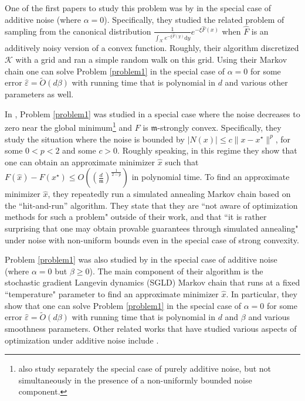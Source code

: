 \documentclass[final,12pt]{colt2018} %
\begin{document}
{\noindent
One of the first papers to study this problem was  by  \cite{applegate_kannan} in the special case of additive noise (where $\alpha=0$).  
%
Specifically, they studied the related problem of sampling from the canonical distribution $ \frac{1}{\int_{\mathcal{K}}e^{-\xi \hat{F}(y)}\mathrm{d}y}e^{-\xi \hat{F}(x)}$ when $\hat{F}$ is an additively noisy version of a convex function. 
%
Roughly, their algorithm discretized $\mathcal{K}$ with a grid and ran a simple random walk on this grid.  
%
Using their Markov chain one can solve Problem \ref{problem1} in the special case of $\alpha = 0$ for some error $\hat{\varepsilon} =\tilde{O}(d\beta)$ with running time that is polynomial in $d$  and various other parameters as well.
%




In \cite{Simulated_Annealing_Nonassymptotic},  Problem \ref{problem1} was studied in a  special case where the noise decreases to zero near the global minimum\footnote{\cite{Simulated_Annealing_Nonassymptotic} also study separately the special case of purely additive noise, but not simultaneously in the presence of a non-uniformly bounded noise component.} and $F$ is $\mathfrak{m}$-strongly convex.
%
Specifically, they study the situation where the noise is bounded by $|N(x)| \leq c\|x-x^{\star}\|^p$, for some $0<p<2$ and some $c>0$.
%
Roughly speaking, in this regime they show that one can obtain an approximate minimizer $\hat{x}$ such that $F(\hat{x}) - F(x^\star) \leq O((\frac{d}{\mathfrak{m}})^{\frac{1}{2-p}})$ in polynomial time. 
%
 To find an approximate minimizer $\hat{x}$, they repeatedly run a simulated annealing Markov chain based on the ``hit-and-run'' algorithm.
 They state that they are ``not aware of optimization methods for such a problem" outside of their work, and that ``it is rather surprising that one may obtain provable guarantees through simulated annealing" under noise with non-uniform bounds even in the special case of strong convexity.   
 
   
Problem \ref{problem1} was also studied by \cite{hitting_times}  in the special case of  additive noise (where $\alpha=0$ but $\beta \geq 0$).
%
The main component of their algorithm is the  stochastic gradient Langevin dynamics (SGLD) Markov chain that runs at a fixed ``temperature" parameter to find an approximate minimizer $\hat{x}$.  
%
In particular, they show that one can solve Problem \ref{problem1} in the special case of $\alpha = 0$ for some error $\hat{\varepsilon} =\tilde{O}(d\beta)$ with running time that is polynomial in $d$ and $\beta$ and various smoothness parameters.
 Other related works that have studied various aspects of optimization under additive noise  include  \citep{singer2015information,hazan2016graduated, risteski2016algorithms}.
  
}
\end{document}
